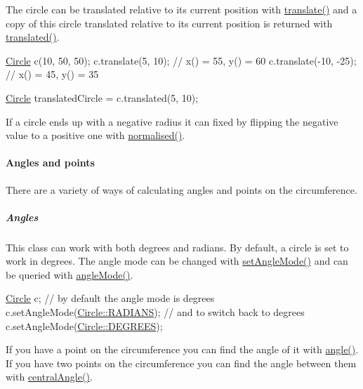 The circle can be translated relative to its current position with \hyperlink{classprism_1_1_circle_ab11cd4ad2acffd0b55989c32a04a8e2d}{translate()} and a copy of this circle translated relative to its current position is returned with \hyperlink{classprism_1_1_circle_a255dcfc157fc52c83e0cbd9e54a65b89}{translated()}.


\begin{DoxyCode}
\hyperlink{classprism_1_1_circle_aff41793f64e90d15a4d89851b1a6b011}{Circle} c(10, 50, 50);
c.translate(5, 10); \textcolor{comment}{// x() = 55, y() = 60}
c.translate(-10, -25); \textcolor{comment}{// x() = 45, y() = 35}

\hyperlink{classprism_1_1_circle_aff41793f64e90d15a4d89851b1a6b011}{Circle} translatedCircle = c.translated(5, 10);
\end{DoxyCode}


If a circle ends up with a negative radius it can fixed by flipping the negative value to a positive one with \hyperlink{classprism_1_1_circle_a6216b04502cff2b3367d417b1c4b3c5a}{normalised()}.

\paragraph*{Angles and points}

There are a variety of ways of calculating angles and points on the circumference.

\subparagraph*{Angles}

This class can work with both degrees and radians. By default, a circle is set to work in degrees. The angle mode can be changed with \hyperlink{classprism_1_1_circle_a499055061dc996d184dca570ebe8a8ff}{set\+Angle\+Mode()} and can be queried with \hyperlink{classprism_1_1_circle_a0aa261d16ff55088e5695820fa95e09b}{angle\+Mode()}.


\begin{DoxyCode}
\hyperlink{classprism_1_1_circle_aff41793f64e90d15a4d89851b1a6b011}{Circle} c; \textcolor{comment}{// by default the angle mode is degrees}
c.setAngleMode(\hyperlink{classprism_1_1_circle_a74c7c532b4eb120b9227b7fabeffe6aca4e738ac91c0d446d1cd6c0ee11a7baaf}{Circle::RADIANS});
\textcolor{comment}{// and to switch back to degrees}
c.setAngleMode(\hyperlink{classprism_1_1_circle_a74c7c532b4eb120b9227b7fabeffe6aca38d734252b9b86d558359698434cf5d4}{Circle::DEGREES});
\end{DoxyCode}


If you have a point on the circumference you can find the angle of it with \hyperlink{classprism_1_1_circle_ad4b91cf13b593a67abf9782db3fec5d9}{angle()}. If you have two points on the circumference you can find the angle between them with \hyperlink{classprism_1_1_circle_aee1d224313e23f96ae2fcff7abeaf336}{central\+Angle()}.


